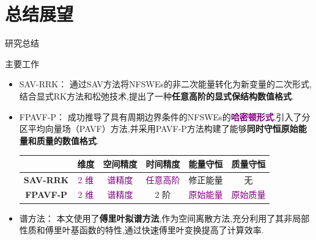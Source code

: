 \documentclass[aspectratio=169]{beamer}
\numberwithin{theorem}{section} %
\numberwithin{equation}{section}%
\numberwithin{figure}{section}%
\numberwithin{table}{section}%
\begin{document}
\section{总结展望}
\begin{frame}{研究总结}
	\begin{block}{主要工作}
			\begin{itemize}
				\item \textcolor[rgb]{0.227,0.373,0.306}{SAV-RRK：} 通过SAV方法将NFSWEs的非二次能量转化为新变量的二次形式,结合显式RK方法和松弛技术,提出了一种\textbf{\textcolor[rgb]{0.227,0.373,0.306}{任意高阶的显式保结构数值格式}}.
				\item \textcolor[rgb]{0.227,0.373,0.306}{FPAVF-P：} 成功推导了具有周期边界条件的NFSWEs的\textbf{\textcolor{purple}{哈密顿形式}},引入了分区平均向量场（PAVF）方法,并采用PAVF-P方法构建了能够\textbf{\textcolor[rgb]{0.227,0.373,0.306}{同时守恒原始能量和质量的数值格式}}.
				\begin{table}[htbp]
					\centering
					  \begin{tabular}{cccccc}
					  \toprule
					  \textcolor[rgb]{0.227,0.373,0.306}{} & \textcolor[rgb]{0.227,0.373,0.306}{\textbf{维度}} & \textcolor[rgb]{0.227,0.373,0.306}{\textbf{空间精度}} & \textcolor[rgb]{0.227,0.373,0.306}{\textbf{时间精度}} & \textcolor[rgb]{0.227,0.373,0.306}{\textbf{能量守恒}} & \textcolor[rgb]{0.227,0.373,0.306}{\textbf{质量守恒}} \\
					  \midrule
					  \textcolor[rgb]{0.227,0.373,0.306}{\textbf{SAV-RRK}} & \textcolor{purple}{2 维}   & \textcolor{purple}{谱精度}   & \textcolor{purple}{任意高阶}  & 修正能量  & 无 \\
					  \midrule
					  \textcolor[rgb]{0.227,0.373,0.306}{\textbf{FPAVF-P}} & \textcolor{purple}{2 维}   & \textcolor{purple}{谱精度}   & 2 阶   & \textcolor{purple}{原始能量}  & \textcolor{purple}{原始质量} \\
					  \bottomrule
					  \end{tabular}%
					\label{tab:3}%
				  \end{table}%
				\item \textcolor[rgb]{0.227,0.373,0.306}{谱方法：} 本文使用了\textbf{\textcolor[rgb]{0.227,0.373,0.306}{傅里叶拟谱方法}},作为空间离散方法,充分利用了其非局部性质和傅里叶基函数的特性,通过快速傅里叶变换提高了计算效率.
			\end{itemize}
			
		\end{block}
		
\end{frame}
\end{document}
